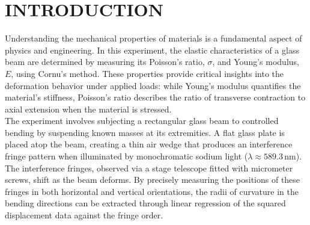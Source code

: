 \documentclass[a4paper,11pt]{article}
\begin{document}
\newpage
\renewcommand{\contentsname}{CONTENTS}
\renewcommand{\cftsecleader}{\cftdotfill{\cftdotsep}} %
\renewcommand{\cftdotsep}{1.0} %
\begin{center}
\tableofcontents
\end{center}
\label{sec:CONTENTS}

\newpage
\renewcommand{\listtablename}{LIST OF TABLES}
{}
\label{sec:LIST OF TABLES}
\begin{center}
\listoftables
\end{center}

\newpage
\renewcommand{\listfigurename}{LIST OF FIGURES}
{}
\label{sec:LIST OF FIGURES}
\begin{center}
\listoffigures
\end{center}

\newpage
{} 
\section{\centering INTRODUCTION}
\label{sec:INTRODUCTION}
\indent

Understanding the mechanical properties of materials is a fundamental aspect of physics and engineering. In this experiment, the elastic characteristics of a glass beam are determined by measuring its Poisson's ratio, \(\sigma\), and Young's modulus, \(E\), using Cornu's method. These properties provide critical insights into the deformation behavior under applied loads: while Young's modulus quantifies the material's stiffness, Poisson's ratio describes the ratio of transverse contraction to axial extension when the material is stressed.\\

The experiment involves subjecting a rectangular glass beam to controlled bending by suspending known masses at its extremities. A flat glass plate is placed atop the beam, creating a thin air wedge that produces an interference fringe pattern when illuminated by monochromatic sodium light (\(\lambda \approx 589.3\,\mathrm{nm}\)). The interference fringes, observed via a stage telescope fitted with micrometer screws, shift as the beam deforms. By precisely measuring the positions of these fringes in both horizontal and vertical orientations, the radii of curvature in the bending directions can be extracted through linear regression of the squared displacement data against the fringe order.\\
\end{document}
